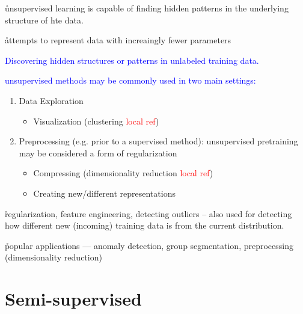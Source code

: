 \r{unsupervised learning is capable of finding hidden patterns in the underlying structure of hte data.}

\r{attempts to represent data with increaingly fewer parameters}

\textcolor{blue}{Discovering hidden structures or patterns in unlabeled training data.}


\textcolor{blue}{unsupervised methods may be commonly used in two main settings:}
\begin{enumerate}[noitemsep,topsep=0pt]
	\item Data Exploration
	\begin{itemize}[noitemsep,topsep=0pt]
		\item Visualization (clustering \textcolor{red}{local ref})
	\end{itemize}
	\item Preprocessing (e.g. prior to a supervised method): unsupervised pretraining may be considered a form of regularization
	\begin{itemize}[noitemsep,topsep=0pt]
		\item Compressing (dimensionality reduction \textcolor{red}{local ref})
		\item Creating new/different representations
	\end{itemize}
\end{enumerate}

\r{regularization, feature engineering, detecting outliers -- also used for detecting how different new (incoming) training data is from the current distribution.}

\r{popular applications --- anomaly detection, group segmentation, preprocessing (dimensionality reduction)}






%


\chapter{Semi-supervised}


